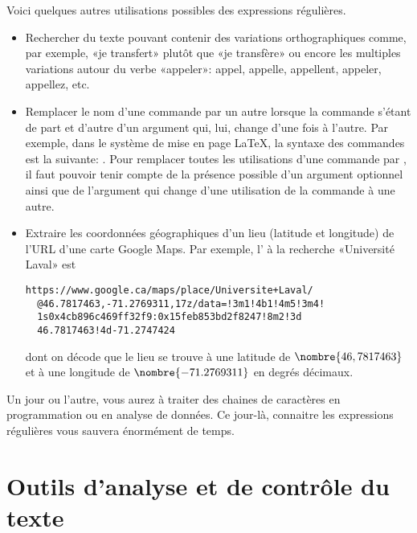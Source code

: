 Voici quelques autres utilisations possibles des expressions
régulières.
\begin{itemize}
\item Rechercher du texte pouvant contenir des variations
  orthographiques comme, par exemple, «je transfert» plutôt que «je
  transfère» ou encore les multiples variations autour du verbe
  «appeler»: appel, appelle, appellent, appeler, appellez, etc.
\item Remplacer le nom d'une commande par un autre lorsque la commande
  s'étant de part et d'autre d'un argument qui, lui, change d'une fois
  à l'autre. Par exemple, dans le système de mise en page {\LaTeX}, la
  syntaxe des commandes est la suivante:
  \cmdprint{\cmd}. Pour remplacer toutes les
  utilisations d'une commande \cmdprint{\foo} par \cmdprint{\bar}, il
  faut pouvoir tenir compte de la présence possible d'un argument
  optionnel  ainsi que de l'argument  qui
  change d'une utilisation de la commande à une autre.
\item Extraire les coordonnées géographiques d'un lieu (latitude et
  longitude) de l'URL d'une carte Google Maps. Par exemple, l'%
   à la recherche «Université Laval» est
  \begin{Schunk}
\begin{Verbatim}
https://www.google.ca/maps/place/Universite+Laval/
  @46.7817463,-71.2769311,17z/data=!3m1!4b1!4m5!3m4!
  1s0x4cb896c469ff32f9:0x15feb853bd2f8247!8m2!3d
  46.7817463!4d-71.2747424
\end{Verbatim}
  \end{Schunk}
  dont on décode que le lieu se trouve à une latitude de
  $\nombre{46,7817463}$ et à une longitude de $\nombre{-71.2769311}$
  en degrés décimaux.
\end{itemize}

Un jour ou l'autre, vous aurez à traiter des chaines de caractères en
programmation ou en analyse de données. Ce jour-là, connaitre les
expressions régulières vous sauvera énormément de temps.


\section{Outils d'analyse et de contrôle du texte}
\label{sec:texte:outils}

